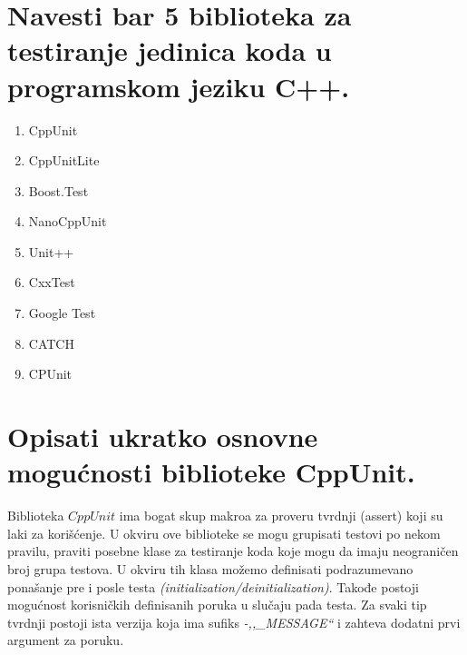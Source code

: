 \documentclass[a4paper]{article}
\begin{document}
\section{Navesti bar 5 biblioteka za testiranje jedinica koda u programskom jeziku C++.}
  \begin{enumerate}
    \item CppUnit
    \item CppUnitLite
    \item Boost.Test
    \item NanoCppUnit
    \item Unit++
    \item CxxTest
    \item Google Test
    \item CATCH
    \item CPUnit
  \end{enumerate}

\section{Opisati ukratko osnovne mogućnosti biblioteke CppUnit.}
  Biblioteka $CppUnit$ ima bogat skup makroa za proveru tvrdnji (assert) koji su laki za korišćenje.
  U okviru ove biblioteke se mogu grupisati testovi po nekom pravilu, praviti posebne klase
  za testiranje koda koje mogu da imaju neograničen broj grupa testova. U okviru tih klasa
  možemo definisati podrazumevano ponašanje pre i posle testa \textit{(initialization/deinitialization)}.
  Takođe postoji mogućnost korisničkih definisanih poruka u slučaju pada testa. Za svaki tip tvrdnji
  postoji ista verzija koja ima sufiks \textit{-,,\_MESSAGE``} i zahteva dodatni prvi argument za poruku. 
\end{document}
